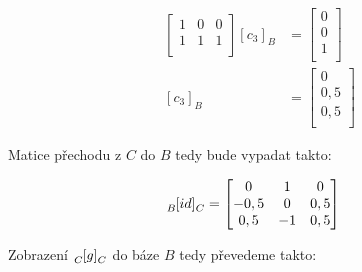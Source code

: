 \documentclass{article}
\begin{document}
\begin{align*}
\begin{bmatrix}
        1 & 0  & 0 \\
        1 & 1  & 1 \\
    \end{bmatrix} [c_3]_B & = \begin{bmatrix}
                                  0 \\
                                  0 \\
                                  1 \\
                              \end{bmatrix} \\
    [c_3]_B               & = \begin{bmatrix}
                                  0   \\
                                  0,5 \\
                                  0,5 \\
                              \end{bmatrix}
\end{align*}

Matice přechodu z $C$ do $B$ tedy bude vypadat takto:

\begin{align*}
    \tensor[_B]{[id]}{_C} & = \begin{bmatrix}
                                  0    & 1  & 0   \\
                                  -0,5 & 0  & 0,5 \\
                                  0,5  & -1 & 0,5
                              \end{bmatrix}
\end{align*}

Zobrazení $\tensor[_C]{[g]}{_C}$ do báze $B$ tedy převedeme takto:
\end{document}
